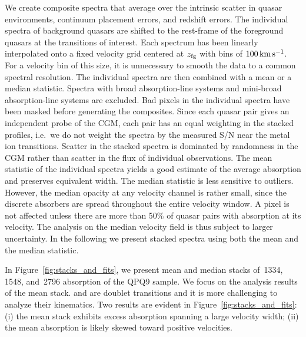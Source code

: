 \documentclass[iop]{emulateapj}
\begin{document}
We create composite spectra that average over the intrinsic scatter in quasar environments,
continuum placement errors, and redshift errors. The individual spectra of background quasars are
shifted to the rest-frame of the foreground quasars at the transitions of interest. Each spectrum
has been linearly interpolated onto a fixed velocity grid centered at $z_{\rm fg}$ with bins of
$100\,{\rm km\,s^{-1}}$. For a velocity bin of this size, it is unnecessary to smooth the data to
a common spectral resolution.
The individual spectra are then combined with a mean or a median
statistic.
Spectra with broad absorption-line systems and mini-broad absorption-line systems are excluded.
Bad pixels in the individual spectra have been masked before generating the
composites. Since each quasar pair gives an independent probe of the CGM, each pair has an equal
weighting in the stacked profiles, i.e.\ we do not weight the spectra by the measured S/N near the
metal ion transitions. Scatter in the stacked spectra is dominated by randomness in the CGM rather
than scatter in the flux of individual observations. The mean statistic of the individual spectra
yields a good estimate of the average absorption and preserves equivalent width. The median
statistic is less sensitive to outliers. However, the median opacity at any velocity channel is
rather small, since the discrete absorbers are spread throughout the entire velocity window.
A pixel is not affected unless there are more than 50\% of quasar pairs with absorption at its
velocity. The analysis on the median velocity field is thus subject to larger uncertainty. In the
following we present stacked spectra using both the mean and the median statistic.

In Figure~\ref{fig:stacks_and_fits}, we present mean and median stacks of \,1334,
\,1548, and \,2796 absorption of the QPQ9 sample. We focus on the
analysis results of the  mean stack.  and  are doublet transitions
and it is more challenging to analyze their kinematics.
Two results are evident in Figure~\ref{fig:stacks_and_fits}: (i) the mean  stack
exhibits excess absorption spanning a large velocity width; (ii) the mean absorption is likely
skewed toward positive velocities.
\end{document}
